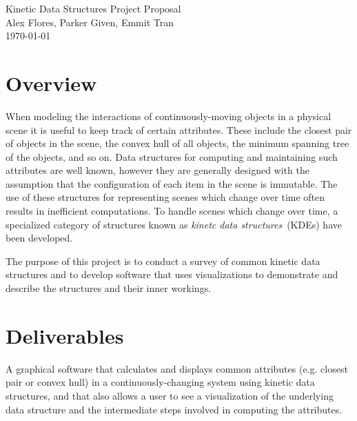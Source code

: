 \documentclass[letterpaper,oneside,12pt]{article}
\begin{document}
  \nocite{*}
  \pagestyle{plain}
  \begin{center}
    {\LARGE Kinetic Data Structures Project Proposal} \\ 
    {\Large Alex Flores, Parker Given, Emmit Tran } \\
    {\large \today } \\
  \end{center}

  \section*{Overview}

  \noindent When modeling the interactions of continuously-moving objects in a physical
  scene it is useful to keep track of certain attributes. These include the closest pair of
  objects in the scene, the convex hull of all objects, the minimum spanning tree of
  the objects, and so on. Data structures for computing and maintaining such attributes 
  are well known, however they are generally designed with the assumption that the 
  configuration of each item in the scene is immutable. The use of these structures 
  for representing scenes which change over time often results in inefficient computations. 
  To handle scenes which change over time, a specialized category of structures known as
  \textit{kinetc data structures}~(KDEs) have been developed.
  
  \noindent The purpose of this project is to conduct a survey of common kinetic data
  structures and to develop software that uses visualizations to demonstrate and describe
  the structures and their inner workings.

  \section*{Deliverables}
  A graphical software that calculates and displays common attributes (e.g. closest pair or 
  convex hull) in a continuously-changing system using kinetic data structures, and that
  also allows a user to see a visualization of the underlying data structure and the intermediate
  steps involved in computing the attributes.

  \renewcommand\refname{Tentative Bibliography}
  
  
\end{document}
